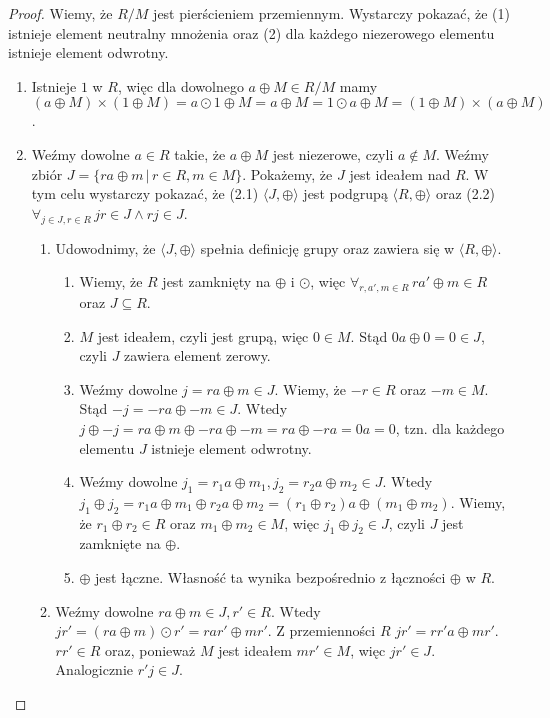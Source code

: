 \documentclass[polish,declaration,shortabstract]{iithesis}
\theoremstyle{definition}
\theoremstyle{remark} \newtheorem{observation}{Obserwacja}
\theoremstyle{plain} \newtheorem{theorem}{Twierdzenie}
\theoremstyle{plain} \newtheorem{lemma}{Lemat}
\theoremstyle{remark} \newtheorem*{remark*}{Uwaga}
\theoremstyle{reminder} \newtheorem*{reminder*}{Przypomnienie}
\begin{document}
\begin{proof}
	Wiemy, że $R/M$ jest pierścieniem przemiennym. Wystarczy pokazać, że (1) istnieje element neutralny mnożenia oraz (2) dla każdego niezerowego elementu istnieje element odwrotny.
	\begin{enumerate}[label=(\arabic*),leftmargin=.4in]
		\item Istnieje $1$ w $R$, więc dla dowolnego $a \oplus M \in R/M$ mamy
		      $(a \oplus M) \times (1 \oplus M) = a \odot 1 \oplus M = a \oplus M = 1 \odot a \oplus M = (1 \oplus M) \times (a \oplus M)$.
		\item Weźmy dowolne $a \in R$ takie, że $a \oplus M$ jest niezerowe, czyli $a \notin M$. Weźmy zbiór $J = \{ra \oplus m \, | \, r \in R, m \in M\}$. Pokażemy, że $J$ jest ideałem nad $R$. W tym celu wystarczy pokazać, że (2.1) $\langle J, \oplus \rangle$ jest podgrupą $\langle R, \oplus \rangle$ oraz (2.2)$\forall_{j \in J, r \in R} \, jr \in J \wedge rj \in J$.
		      \begin{enumerate}[label=(2.\arabic*)]
		      	\item Udowodnimy, że $\langle J, \oplus \rangle$ spełnia definicję grupy oraz zawiera się w $\langle R, \oplus \rangle$.
		      	      \begin{enumerate}[label=(2.1.\arabic*)]
		      	      	\item Wiemy, że $R$ jest zamknięty na $\oplus$ i $\odot$, więc $\forall_{r, a', m \in R} \, ra' \oplus m \in R$ oraz $J \subseteq R$. 
		      	      	\item $M$ jest ideałem, czyli jest grupą, więc $0 \in M$. Stąd $0a \oplus 0 = 0 \in J$, czyli $J$ zawiera element zerowy.
		      	      	\item Weźmy dowolne $j = ra \oplus m \in J$. Wiemy, że $-r \in R$ oraz $-m \in M$. Stąd $-j = -ra \oplus -m \in J$. Wtedy $j \oplus -j = ra \oplus m \oplus -ra \oplus -m = ra \oplus -ra = 0a = 0$, tzn. dla każdego elementu $J$ istnieje element odwrotny.
		      	      	\item Weźmy dowolne $j_1 = r_1a \oplus m_1, j_2 = r_2a \oplus m_2 \in J$. Wtedy $j_1 \oplus j_2 = r_1a \oplus m_1 \oplus r_2a \oplus m_2 = (r_1 \oplus r_2)a \oplus (m_1 \oplus m_2)$. Wiemy, że $r_1 \oplus r_2 \in R$ oraz $m_1 \oplus m_2 \in M$, więc $j_1 \oplus j_2 \in J$, czyli $J$ jest zamknięte na $\oplus$.
		      	      	\item $\oplus$ jest łączne. Własność ta wynika bezpośrednio z łączności $\oplus$ w $R$.
		      	      \end{enumerate}
		      	\item Weźmy dowolne $ra \oplus m \in J, r' \in R$. Wtedy $jr' = (ra \oplus m) \odot r' = rar' \oplus mr'$. Z przemienności $R$ $jr' = rr'a \oplus mr'$. $rr' \in R$ oraz, ponieważ $M$ jest ideałem $mr' \in M$, więc $jr' \in J$. Analogicznie $r'j \in J$.

\end{enumerate}
\end{enumerate}
\end{proof}
\end{document}
